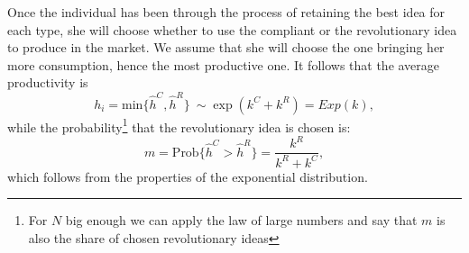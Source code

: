 Once the individual has been through the process of retaining the best idea for each type, she will choose whether to use the compliant or the revolutionary idea to produce in the market. We assume that she will choose the one bringing her more consumption, hence the most productive one. It follows that the average productivity is
\begin{equation}
h_i=\text{min}\{\hat{h}^C,\hat{h}^R\} \ \sim \exp(k^C+k^R)=Exp(k),
\end{equation}
while the probability\footnote{For $N$ big enough we can apply the law of large numbers and say that $m$ is also the share of chosen revolutionary ideas} that the revolutionary idea is chosen is:
\begin{equation}\label{eq:sharer}
m=\text{Prob}\{\hat{h}^C>\hat{h}^R\}=\frac{k^R}{k^R+k^C},
\end{equation}
which follows from the properties of the exponential distribution.


